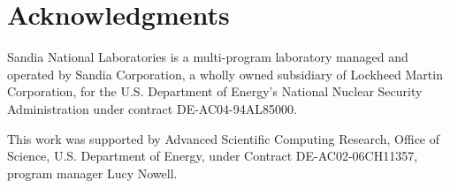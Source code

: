 \documentclass[conference]{IEEEtran}
\begin{document}
%

\section*{Acknowledgments}

Sandia National Laboratories is a multi-program laboratory managed and operated
by Sandia Corporation, a wholly owned subsidiary of Lockheed Martin
Corporation, for the U.S. Department of Energy's National Nuclear Security
Administration under contract DE-AC04-94AL85000.

This work was supported by Advanced Scientific Computing Research, Office of
Science, U.S. Department of Energy, under Contract DE-AC02-06CH11357, program
manager Lucy Nowell.




\vfill\eject
\end{document}
